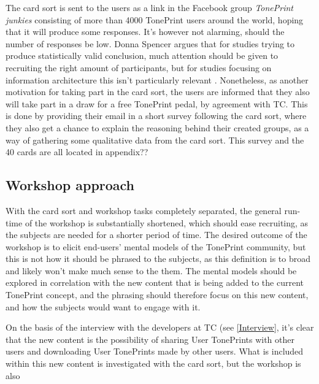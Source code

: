 The card sort is sent to the users as a link in the Facebook group \textit{TonePrint junkies} consisting of more than 4000 TonePrint users around the world, hoping that it will produce some responses. It's however not alarming, should the number of responses be low. Donna Spencer argues that for studies trying to produce statistically valid conclusion, much attention should be given to recruiting the right amount of participants, but for studies focusing on information architecture this isn't particularly relevant \parencite[][130]{WEB:DonnaSpencer}. Nonetheless, as another motivation for taking part in the card sort, the users are informed that they also will take part in a draw for a free TonePrint pedal, by agreement with TC. This is done by providing their email in a short survey following the card sort, where they also get a chance to explain the reasoning behind their created groups, as a way of gathering some qualitative data from the card sort. This survey and the 40 cards are all located in appendix?? 

\subsection{Workshop approach}
\label{WorkshopApproach}
With the card sort and workshop tasks completely separated, the general run-time of the workshop is substantially shortened, which should ease recruiting, as the subjects are needed for a shorter period of time. The desired outcome of the workshop is to elicit end-users' mental models of the TonePrint community, but this is not how it should be phrased to the subjects, as this definition is to broad and likely won't make much sense to the them. The mental models should be explored in correlation with the new content that is being added to the current TonePrint concept, and the phrasing should therefore focus on this new content, and how the subjects would want to engage with it.

On the basis of the interview with the developers at TC (see \autoref{Interview}, it's clear that the new content is the possibility of sharing User TonePrints with other users and downloading User TonePrints made by other users. What is included within this new content is investigated with the card sort, but the workshop is also 



